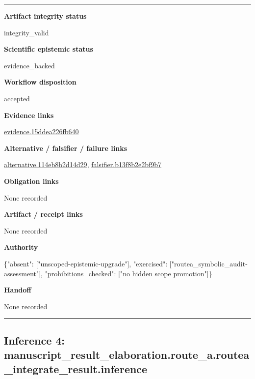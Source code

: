 \documentclass[10pt,a4paper]{article}
\newcommand{\TraceField}[2]{\par\noindent\textbf{#1}\par\noindent #2\par\smallskip}
\newenvironment{TraceDossier}{\par\medskip\noindent\hrule\medskip}{\medskip\hrule\par\medskip}
\begin{document}
\begin{TraceDossier}
\TraceField{Artifact integrity status}{integrity\_\allowbreak{}valid}

\TraceField{Scientific epistemic status}{evidence\_\allowbreak{}backed}

\TraceField{Workflow disposition}{accepted}

\TraceField{Evidence links}{\hyperlink{trace-evidence-b9a30c7bd759b06061}{evidence.\allowbreak{}15ddea226f\allowbreak{}b640}}

\TraceField{Alternative / falsifier / failure links}{\hyperlink{trace-alternative-e116ca4ee4115be37b}{alternativ\allowbreak{}e.\allowbreak{}114eb8b2d1\allowbreak{}4d29}, \hyperlink{trace-alternative-085ec8fdcf51493f6f}{falsifier.\allowbreak{}b13f8b2e2b\allowbreak{}f9b7}}

\TraceField{Obligation links}{None recorded}

\TraceField{Artifact / receipt links}{None recorded}

\TraceField{Authority}{\{"absent":\allowbreak{} ["unscoped\allowbreak{}-\allowbreak{}epistemic-\allowbreak{}upgrade"],\allowbreak{} "exercised\allowbreak{}":\allowbreak{} ["routea\_\allowbreak{}symbolic\_\allowbreak{}audit-\allowbreak{}assessment\allowbreak{}"], "prohibiti\allowbreak{}ons\_\allowbreak{}checked":\allowbreak{} ["no hidden scope promotion"\allowbreak{}]\}}

\TraceField{Handoff}{None recorded}

\end{TraceDossier}
\pagebreak[2]\subsection{Inference 4: manuscript\allowbreak{}\_\allowbreak{}result\_\allowbreak{}elaboratio\allowbreak{}n.\allowbreak{}route\_\allowbreak{}a.\allowbreak{}routea\_\allowbreak{}integrate\_\allowbreak{}result.\allowbreak{}inference}\label{trace-inference-9c5b6a31ad18ae3874}
\end{document}
